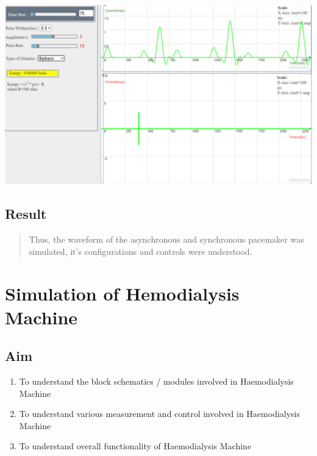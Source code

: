 \documentclass[
  11pt,
  letterpaper,
  DIV=11,
  numbers=noendperiod]{scrreprt}
\providecommand{\tightlist}{%
  \setlength{\itemsep}{0pt}\setlength{\parskip}{0pt}}\usepackage{longtable,booktabs,array}
\begin{document}
\begin{center}
\includegraphics[width=6.04167in,height=\textheight]{images/clipboard-3757172610.png}
\end{center}

\section{Result}\label{result-7}

\begin{quote}
Thus, the waveform of the asynchronous and synchronous pacemaker was
simulated, it's configurations and controls were understood.
\end{quote}


\chapter{Simulation of Hemodialysis
Machine}\label{simulation-of-hemodialysis-machine}

\section{Aim}\label{aim-9}

\begin{enumerate}
\def\labelenumi{\arabic{enumi}.}
\tightlist
\item
  To understand the block schematics / modules involved in Haemodialysis
  Machine
\item
  To understand various measurement and control involved in
  Haemodialysis Machine
\item
  To understand overall functionality of Haemodialysis Machine
\end{enumerate}
\end{document}
